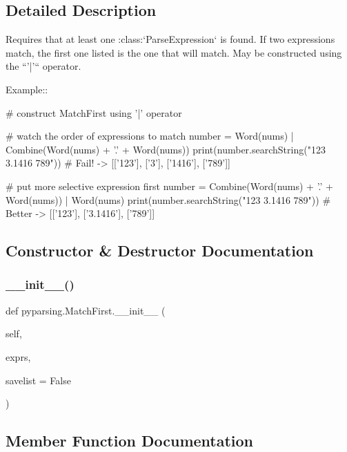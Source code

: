 \subsection{Detailed Description}
\begin{DoxyVerb}Requires that at least one :class:`ParseExpression` is found. If
two expressions match, the first one listed is the one that will
match. May be constructed using the ``'|'`` operator.

Example::

    # construct MatchFirst using '|' operator

    # watch the order of expressions to match
    number = Word(nums) | Combine(Word(nums) + '.' + Word(nums))
    print(number.searchString("123 3.1416 789")) #  Fail! -> [['123'], ['3'], ['1416'], ['789']]

    # put more selective expression first
    number = Combine(Word(nums) + '.' + Word(nums)) | Word(nums)
    print(number.searchString("123 3.1416 789")) #  Better -> [['123'], ['3.1416'], ['789']]
\end{DoxyVerb}
 

\subsection{Constructor \& Destructor Documentation}
\mbox{\label{classpyparsing_1_1MatchFirst_a8e4cc704504d71c63f42e6f3204065ba}} 
\subsubsection{\texorpdfstring{\+\_\+\+\_\+init\+\_\+\+\_\+()}{\_\_init\_\_()}}
{\footnotesize\ttfamily def pyparsing.\+Match\+First.\+\_\+\+\_\+init\+\_\+\+\_\+ (\begin{DoxyParamCaption}\item[{}]{self,  }\item[{}]{exprs,  }\item[{}]{savelist = {\ttfamily False} }\end{DoxyParamCaption})}



\subsection{Member Function Documentation}
\mbox{\label{classpyparsing_1_1MatchFirst_abee3216bd410a1a6cabe45fa611ad8de}} 

